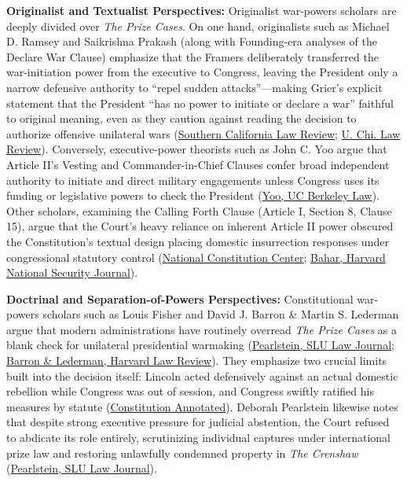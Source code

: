\documentclass[12pt]{article}
\begin{document}
\textbf{Originalist and Textualist Perspectives:} Originalist war-powers scholars are deeply divided over \textit{The Prize Cases}. On one hand, originalists such as Michael D. Ramsey and Saikrishna Prakash (along with Founding-era analyses of the Declare War Clause) emphasize that the Framers deliberately transferred the war-initiation power from the executive to Congress, leaving the President only a narrow defensive authority to ``repel sudden attacks''---making Grier's explicit statement that the President ``has no power to initiate or declare a war'' faithful to original meaning, even as they caution against reading the decision to authorize offensive unilateral wars (\href{https://southerncalifornialawreview.com/2024/02/20/delegating-war-powers/}{Southern California Law Review}; \href{https://lawreview.uchicago.edu/sites/default/files/78-1-ExecutivePower\%20and\%20the\%20Discipline\%20of\%20History-Mortenson.pdf}{U. Chi. Law Review}). Conversely, executive-power theorists such as John C. Yoo argue that Article II's Vesting and Commander-in-Chief Clauses confer broad independent authority to initiate and direct military engagements unless Congress uses its funding or legislative powers to check the President (\href{https://www.law.berkeley.edu/archive/files/yoowarpowers.pdf}{Yoo, UC Berkeley Law}). Other scholars, examining the Calling Forth Clause (Article I, Section 8, Clause 15), argue that the Court's heavy reliance on inherent Article II power obscured the Constitution's textual design placing domestic insurrection responses under congressional statutory control (\href{https://constitutioncenter.org/the-constitution/articles/article-ii/clauses/345}{National Constitution Center}; \href{https://journals.law.harvard.edu/nsj/wp-content/uploads/sites/82/2014/01/Bahar-Presidential-Intervention-Principle.pdf}{Bahar, Harvard National Security Journal}).

\textbf{Doctrinal and Separation-of-Powers Perspectives:} Constitutional war-powers scholars such as Louis Fisher and David J. Barron \& Martin S. Lederman argue that modern administrations have routinely overread \textit{The Prize Cases} as a blank check for unilateral presidential warmaking (\href{https://scholarship.law.slu.edu/cgi/viewcontent.cgi?article=1581&context=lj}{Pearlstein, SLU Law Journal}; \href{https://harvardlawreview.org/wp-content/uploads/2007/12/barron_lederman.pdf}{Barron \& Lederman, Harvard Law Review}). They emphasize two crucial limits built into the decision itself: Lincoln acted defensively against an actual domestic rebellion while Congress was out of session, and Congress swiftly ratified his measures by statute (\href{https://www.law.cornell.edu/constitution-conan/article-2/section-2/clause-1/prize-cases-and-commander-in-chief-clause}{Constitution Annotated}). Deborah Pearlstein likewise notes that despite strong executive pressure for judicial abstention, the Court refused to abdicate its role entirely, scrutinizing individual captures under international prize law and restoring unlawfully condemned property in \textit{The Crenshaw} (\href{https://scholarship.law.slu.edu/cgi/viewcontent.cgi?article=1581&context=lj}{Pearlstein, SLU Law Journal}).
\end{document}
